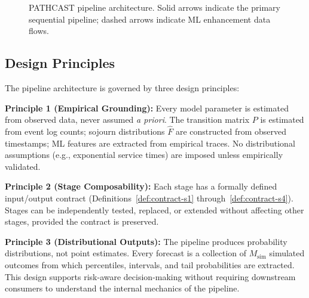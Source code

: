 \begin{figure}[htbp]
\caption{PATHCAST pipeline architecture. Solid arrows indicate the 
primary sequential pipeline; dashed arrows indicate ML enhancement data flows.}
\label{fig:pipeline-architecture}
\end{figure}


\subsection{Design Principles}
\label{sec:design-principles}

The pipeline architecture is governed by three design principles:

\textbf{Principle 1 (Empirical Grounding):} Every model parameter is 
estimated from observed data, never assumed \emph{a priori}. The transition 
matrix $P$ is estimated from event log counts; sojourn distributions 
$\hat{F}$ are constructed from observed timestamps; ML features are 
extracted from empirical traces. No distributional assumptions (e.g., 
exponential service times) are imposed unless empirically validated.

\textbf{Principle 2 (Stage Composability):} Each stage has a formally 
defined input/output contract (Definitions~\ref{def:contract-s1} 
through~\ref{def:contract-s4}). Stages can be independently tested, 
replaced, or extended without affecting other stages, provided the 
contract is preserved.

\textbf{Principle 3 (Distributional Outputs):} The pipeline produces 
probability distributions, not point estimates. Every forecast is a 
collection of $M_{\text{sim}}$ simulated outcomes from which percentiles, 
intervals, and tail probabilities are extracted. This design supports 
risk-aware decision-making without requiring downstream consumers to 
understand the internal mechanics of the pipeline.

